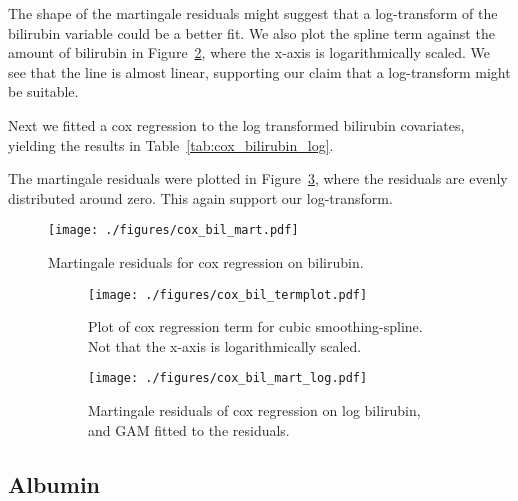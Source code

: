 \documentclass[11pt,a4paper]{article}
\begin{document}
The shape of the martingale residuals might suggest that a log-transform of the bilirubin variable could be a better fit. We also plot the spline term against the amount of bilirubin in Figure~\ref{fig:cox_bil_termplot}, where the x-axis is logarithmically scaled. We see that the line is almost linear, supporting our claim that a log-transform might be suitable.

Next we fitted a cox regression to the log transformed bilirubin covariates, yielding the results in Table~\ref{tab:cox_bilirubin_log}.

The martingale residuals were plotted in Figure~\ref{fig:cox_bil_mart_log}, where the residuals are evenly distributed around zero. This again support our log-transform.



\begin{figure}[h!tb]
    \begin{center}
        \texttt{[image: ./figures/cox\_bil\_mart.pdf]}
    \end{center}
    \vspace{-0.2cm}
    \caption{Martingale residuals for cox regression on bilirubin.}
    \label{fig:cox_bil_mart}
\end{figure}

\begin{figure}[h!tbp]
    \centering
    \begin{subfigure}[b]{0.48\textwidth}
        \texttt{[image: ./figures/cox\_bil\_termplot.pdf]}
        \caption{Plot of cox regression term for cubic smoothing-spline. Not that the x-axis is logarithmically scaled.}
        \label{fig:cox_bil_termplot}
    \end{subfigure}%
    \quad
    \begin{subfigure}[b]{0.48\textwidth}
        \texttt{[image: ./figures/cox\_bil\_mart\_log.pdf]}
        \caption{Martingale residuals of cox regression on log bilirubin, and GAM fitted to the residuals.}
        \label{fig:cox_bil_mart_log}
    \end{subfigure}
    \vspace{1\baselineskip}
    \caption{}
    \label{fig:cox_bil_term_and_mart}
\end{figure}



\subsection{Albumin}

\end{document}

